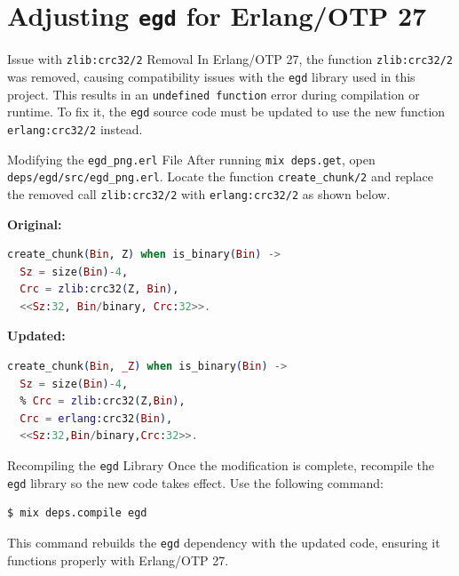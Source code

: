 \documentclass[aspectratio=169, table]{beamer}
\begin{document}
\section{Adjusting \texttt{egd} for Erlang/OTP 27}

\begin{frame}[fragile]{Issue with \texttt{zlib:crc32/2} Removal}
\vspace{20pt}
\small
In Erlang/OTP 27, the function \texttt{zlib:crc32/2} was removed,  
causing compatibility issues with the \texttt{egd} library used in this project.  
This results in an \texttt{undefined function} error during compilation or runtime.  
To fix it, the \texttt{egd} source code must be updated to use the new function  
\texttt{erlang:crc32/2} instead.
\end{frame}


\begin{frame}[fragile]{Modifying the \texttt{egd\_png.erl} File}
\vspace{20pt}
\small
After running \texttt{mix deps.get}, open \texttt{deps/egd/src/egd\_png.erl}.  
Locate the function \texttt{create\_chunk/2} and replace the removed call  
\texttt{zlib:crc32/2} with \texttt{erlang:crc32/2} as shown below.

\textbf{Original:}
\begin{lstlisting}[language=Elixir, basicstyle=\ttfamily\scriptsize]
create_chunk(Bin, Z) when is_binary(Bin) ->
  Sz = size(Bin)-4,
  Crc = zlib:crc32(Z, Bin),
  <<Sz:32, Bin/binary, Crc:32>>.
\end{lstlisting}

\textbf{Updated:}
\begin{lstlisting}[language=Elixir, basicstyle=\ttfamily\scriptsize]
create_chunk(Bin, _Z) when is_binary(Bin) ->
  Sz = size(Bin)-4,
  % Crc = zlib:crc32(Z,Bin),
  Crc = erlang:crc32(Bin),
  <<Sz:32,Bin/binary,Crc:32>>.
\end{lstlisting}
\end{frame}


\begin{frame}[fragile]{Recompiling the \texttt{egd} Library}
\vspace{20pt}
\small
Once the modification is complete, recompile the \texttt{egd} library  
so the new code takes effect. Use the following command:

\begin{lstlisting}[language=bash, basicstyle=\ttfamily\scriptsize]
$ mix deps.compile egd
\end{lstlisting}

This command rebuilds the \texttt{egd} dependency with the updated code,  
ensuring it functions properly with Erlang/OTP 27.
\end{frame}
\end{document}
